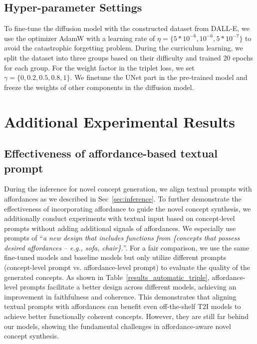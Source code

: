 \subsection{Hyper-parameter Settings}
\label{app:hyperparam}
To fine-tune the diffusion model with the constructed dataset from DALL-E,
we use the optimizer AdamW \citep{loshchilov2019decoupledweightdecayregularization} with a learning rate of $\eta = \{5 * 10^{-6}, 10^{-6}, 5 * 10^{-7}\}$ to avoid the catastrophic forgetting problem. During the curriculum learning, we split the dataset into three groups based on their difficulty and trained 20 epochs for each group. For the weight factor in the triplet loss, we set $\gamma = \{0, 0.2, 0.5, 0.8, 1\}$. We finetune the UNet part in the pre-trained model and freeze the weights of other components in the diffusion model.

\section{Additional Experimental Results}
\subsection{Effectiveness of affordance-based textual prompt}
During the inference for novel concept generation, we align textual prompts with affordances as we described in Sec~\ref{sec:inference}. To further demonstrate the effectiveness of incorporating affordance to guide the novel concept synthesis, we additionally conduct experiments with textual input based on concept-level prompts without adding additional signals of affordances. We especially use prompts of ``\textit{a new design that includes functions from \{concepts that possess desired affordances -- e.g., sofa, chair\}.}''. For a fair comparison, we use the same fine-tuned models and baseline models but only utilize different prompts (concept-level prompt vs. affordance-level prompt) to evaluate the quality of the generated concepts. As shown in Table~\ref{results_automatic_triple}, affordance-level prompts facilitate a better design across different models, achieving an improvement in faithfulness and coherence. This demonstrates that aligning textual prompts with affordances can benefit even off-the-shelf T2I models to achieve better functionally coherent concepts. However, they are still far behind our models, showing the fundamental challenges in affordance-aware novel concept synthesis. 

